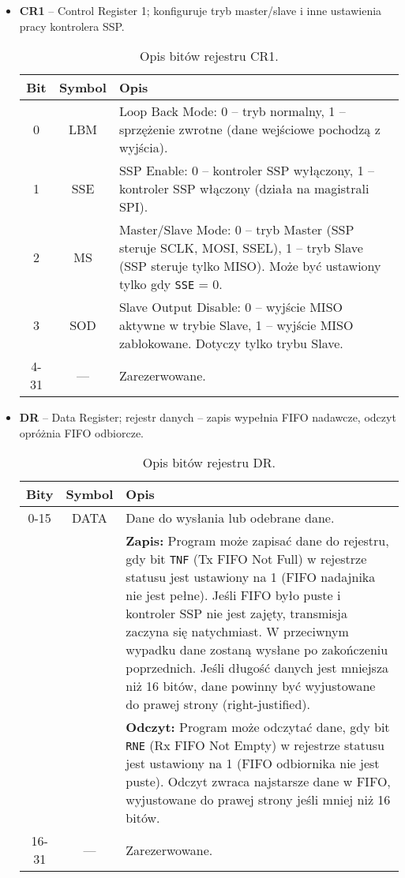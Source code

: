 \begin{itemize}
  
  \item \textbf{CR1} – Control Register 1; konfiguruje tryb master/slave i inne ustawienia pracy kontrolera SSP.

\begin{table}[H]
\centering
\caption{Opis bitów rejestru CR1.}
\vspace{0.5em}
\renewcommand{\arraystretch}{1.2}
\begin{tabular}{|c|c|p{10.2cm}|}
\hline
\textbf{Bit} & \textbf{Symbol} & \textbf{Opis} \\
\hline
0 & LBM & Loop Back Mode: 0 – tryb normalny, 1 – sprzężenie zwrotne (dane wejściowe pochodzą z wyjścia). \\
\hline
1 & SSE & SSP Enable: 0 – kontroler SSP wyłączony, 1 – kontroler SSP włączony (działa na magistrali SPI). \\
\hline
2 & MS & Master/Slave Mode: 0 – tryb Master (SSP steruje SCLK, MOSI, SSEL), 1 – tryb Slave (SSP steruje tylko MISO). Może być ustawiony tylko gdy \texttt{SSE} = 0. \\
\hline
3 & SOD & Slave Output Disable: 0 – wyjście MISO aktywne w trybie Slave, 1 – wyjście MISO zablokowane. Dotyczy tylko trybu Slave. \\
\hline
4-31 & — & Zarezerwowane.\\
\hline
\end{tabular}
\end{table}

  
  \item \textbf{DR} – Data Register; rejestr danych – zapis wypełnia FIFO nadawcze, odczyt opróżnia FIFO odbiorcze.

\begin{table}[H]
\centering
\caption{Opis bitów rejestru DR.}
\vspace{0.5em}
\renewcommand{\arraystretch}{1.2}
\begin{tabular}{|c|c|p{10cm}|}
\hline
\textbf{Bity} & \textbf{Symbol} & \textbf{Opis} \\
\hline
0-15 & DATA & Dane do wysłania lub odebrane dane. \\
\hline
 & & \textbf{Zapis:} Program może zapisać dane do rejestru, gdy bit \texttt{TNF} (Tx FIFO Not Full) w rejestrze statusu jest ustawiony na 1 (FIFO nadajnika nie jest pełne). Jeśli FIFO było puste i kontroler SSP nie jest zajęty, transmisja zaczyna się natychmiast. W przeciwnym wypadku dane zostaną wysłane po zakończeniu poprzednich. Jeśli długość danych jest mniejsza niż 16 bitów, dane powinny być wyjustowane do prawej strony (right-justified). \\
\hline
 & & \textbf{Odczyt:} Program może odczytać dane, gdy bit \texttt{RNE} (Rx FIFO Not Empty) w rejestrze statusu jest ustawiony na 1 (FIFO odbiornika nie jest puste). Odczyt zwraca najstarsze dane w FIFO, wyjustowane do prawej strony jeśli mniej niż 16 bitów. \\
\hline
16-31 & — & Zarezerwowane. \\
\hline
\end{tabular}
\end{table}


\end{itemize}
